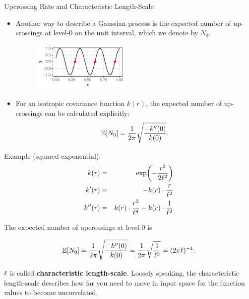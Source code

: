 \begin{frame}[c,allowframebreaks]{Upcrossing Rate and Characteristic Length-Scale}

\begin{itemize}
\item Another way to describe a Gaussian process is the expected number of up-crossings at level-0 on the unit interval, which we denote by $N_0$.
\vspace{3mm}
\begin{figure}
	\includegraphics[width = 0.45\textwidth]{figure/upcrossings-1.pdf}
\end{figure}

\item For an isotropic covariance function $k(r)$, the expected number of up-crossings can be calculated explicitly:
$$
\mathbb{E}[N_0] = \frac{1}{2\pi} \sqrt{\frac{- k^{\prime\prime}(0)}{k(0)}}.
$$

\end{itemize}


\framebreak

Example (squared exponential):
\vspace{-3mm}
\begin{eqnarray*}
k(r) &=& \exp\biggl(-\frac{r^2}{2\ell^2}\biggr)\\
k^\prime(r) &=& - k(r) \cdot \frac{r}{\ell^2} \\
k^{\prime\prime}(r) &=&  k(r) \cdot \frac{r^2}{\ell^4} - k(r) \cdot \frac{1}{\ell^2}
\end{eqnarray*}

\vspace{5mm}
The expected number of upcrossings at level-0 is

$$
\operatorname*{\mathbb{E}}[N_0] = \frac{1}{2\pi} \sqrt{\frac{- k^{\prime\prime}(0)}{k(0)}} = \frac{1}{2\pi} \sqrt{\frac{1}{\ell^2}} = (2\pi \ell)^{-1}.
$$


$\ell$ is called \textbf{characteristic length-scale}. Loosely speaking, the characteristic length-scale describes how far you need to move in input space for the function values to become uncorrelated. 


\end{frame}
